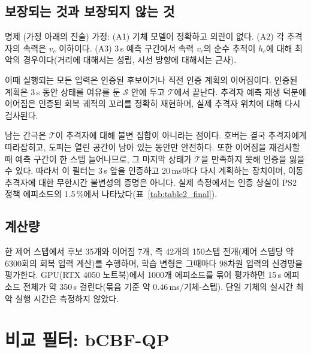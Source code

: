 \documentclass[10pt,a4paper]{article}
\newcommand{\Safe}{\mathcal{S}}
\newcommand{\Term}{\mathcal{T}}
\begin{document}
\subsection{보장되는 것과 보장되지 않는 것}\label{sec:guarantee}
\begin{keybox}{명제 (가정 아래의 진술)}
가정: (A1) 기체 모델이 정확하고 외란이 없다. (A2) 각 추격자의 속력은 $v_c$ 이하이다. (A3) 3\,s 예측 구간에서 속력 $v_c$의 순수 추적이 $h_c$에 대해 최악의 경우이다(거리에 대해서는 성립, 시선 방향에 대해서는 근사).

이때 실행되는 모든 입력은 인증된 후보이거나 직전 인증 계획의 이어짐이다. 인증된 계획은 3\,s 동안 상태를 여유를 둔 $\Safe$ 안에 두고 $\Term$에서 끝난다.
추격자 예측 재생 덕분에 이어짐은 인증된 회복 궤적의 꼬리를 정확히 재현하며, 실제 추격자 위치에 대해 다시 검사된다.
\end{keybox}
남는 간극은 $\Term$이 추격자에 대해 불변 집합이 아니라는 점이다. 호버는 결국 추격자에게 따라잡히고, 도피는 열린 공간이 남아 있는 동안만 안전하다.
또한 이어짐을 재검사할 때 예측 구간이 한 스텝 늘어나므로, 그 마지막 상태가 $\Term$을 만족하지 못해 인증을 잃을 수 있다.
따라서 이 필터는 3\,s 앞을 인증하고 20\,ms마다 다시 계획하는 장치이며, 이동 추격자에 대한 무한시간 불변성의 증명은 아니다.
실제 측정에서는 인증 상실이 PS2 정책 에피소드의 1.5\,\%에서 나타났다(표~\ref{tab:table2_final}).

\subsection{계산량}
한 제어 스텝에서 후보 35개와 이어짐 7개, 즉 42개의 150스텝 전개(제어 스텝당 약 6300회의 회복 입력 계산)를 수행하며, 학습 변형은 그때마다 98차원 입력의 신경망을 평가한다.
GPU(RTX 4050 노트북)에서 1000개 에피소드를 묶어 평가하면 15\,s 에피소드 전체가 약 350\,s 걸린다(묶음 기준 약 0.46\,ms/기체-스텝).
단일 기체의 실시간 최악 실행 시간은 측정하지 않았다.

\section{비교 필터: bCBF-QP}\label{sec:bcbf}
\end{document}

